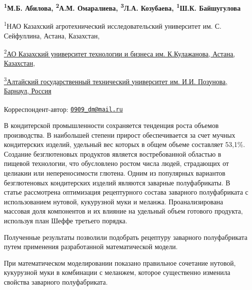 
\begin{articleheader}

{\bfseries \textsuperscript{1}М.Б. Абилова\textsuperscript{\envelope },
\textsuperscript{2}А.М. Омаралиева, \textsuperscript{3}Л.А. Козубаева,
\textsuperscript{1}Ш.К. Байшугулова}
\end{articleheader}

\begin{affiliation}
\textsuperscript{1}НАО Казахский агротехнический исследовательский
университет им. С. Сейфуллина, Астана,
Казахстан,\href{https://bankchart.kz/spravochniki/pochtovyye_indeksy/id/116470}{}

\href{https://bankchart.kz/spravochniki/pochtovyye_indeksy/id/116470}{\textsuperscript{2}АО
Казахский университет технологии и бизнеса им. К.Кулажанова, Астана,
Казахстан,}

\href{https://bankchart.kz/spravochniki/pochtovyye_indeksy/id/116470}{\textsuperscript{3}Алтайский
государственный технический университет им. И.И. Позунова, Барнаул,
Россия}

\raggedright \textsuperscript{\envelope }Корреспондент-автор: \href{mailto:0909_dm@mail.ru}{\nolinkurl{0909\_dm@mail.ru}}
\end{affiliation}

В кондитерской промышленности сохраняется тенденция роста объемов
производства. В наибольшей степени прирост обеспечивается за счет мучных
кондитерских изделий, удельный вес которых в общем объеме составляет
53,1\%. Создание безглютеновых продуктов является востребованной
областью в пищевой технологии, что обусловлено ростом числа людей,
страдающих от целиакии или непереносимости глютена. Одним из популярных
вариантов безглютеновых кондитерских изделий являются заварные
полуфабрикаты. В статье рассмотрена оптимизация рецептурного состава
заварного полуфабриката с использованием нутовой, кукурузной муки и
меланжа. Проанализирована массовая доля компонентов и их влияние на
удельный объем готового продукта, используя план Шеффе третьего порядка.

Полученные результаты позволили подобрать рецептуру заварного
полуфабриката путем применения разработанной математической модели.

При математическом моделировании показано правильное сочетание нутовой,
кукурузной муки в комбинации с меланжем, которое существенно изменила
свойства заварного полуфабриката.

